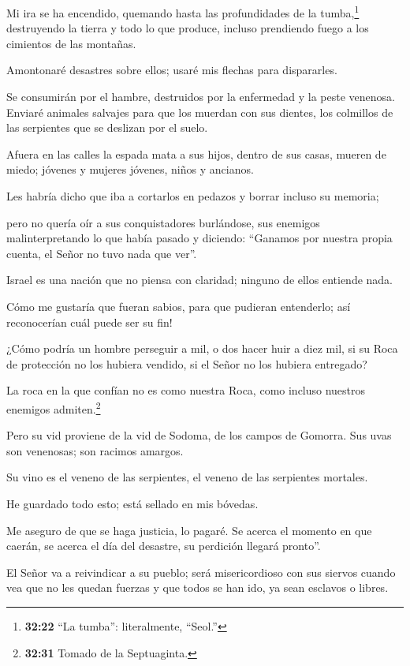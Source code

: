  Mi ira se ha encendido, quemando hasta las profundidades
de la tumba,\footnote{\textbf{32:22} ``La tumba'': literalmente,
  ``Seol.''} destruyendo la tierra y todo lo que produce, incluso
prendiendo fuego a los cimientos de las montañas.

 Amontonaré desastres sobre ellos; usaré mis flechas para
dispararles.

 Se consumirán por el hambre, destruidos por la enfermedad
y la peste venenosa. Enviaré animales salvajes para que los muerdan con
sus dientes, los colmillos de las serpientes que se deslizan por el
suelo.

 Afuera en las calles la espada mata a sus hijos, dentro de
sus casas, mueren de miedo; jóvenes y mujeres jóvenes, niños y ancianos.

 Les habría dicho que iba a cortarlos en pedazos y borrar
incluso su memoria;

 pero no quería oír a sus conquistadores burlándose, sus
enemigos malinterpretando lo que había pasado y diciendo: ``Ganamos por
nuestra propia cuenta, el Señor no tuvo nada que ver''.

 Israel es una nación que no piensa con claridad; ninguno
de ellos entiende nada.

 Cómo me gustaría que fueran sabios, para que pudieran
entenderlo; así reconocerían cuál puede ser su fin!

 ¿Cómo podría un hombre perseguir a mil, o dos hacer huir a
diez mil, si su Roca de protección no los hubiera vendido, si el Señor
no los hubiera entregado?

 La roca en la que confían no es como nuestra Roca, como
incluso nuestros enemigos admiten.\footnote{\textbf{32:31} Tomado de la
  Septuaginta.}

 Pero su vid proviene de la vid de Sodoma, de los campos de
Gomorra. Sus uvas son venenosas; son racimos amargos.

 Su vino es el veneno de las serpientes, el veneno de las
serpientes mortales.

 He guardado todo esto; está sellado en mis bóvedas.

 Me aseguro de que se haga justicia, lo pagaré. Se acerca
el momento en que caerán, se acerca el día del desastre, su perdición
llegará pronto''.

 El Señor va a reivindicar a su pueblo; será misericordioso
con sus siervos cuando vea que no les quedan fuerzas y que todos se han
ido, ya sean esclavos o libres.


